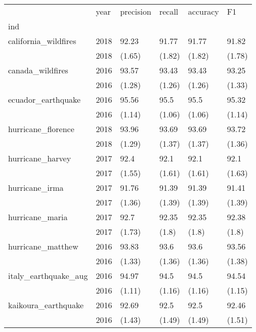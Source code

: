 \begin{tabular}{llllll}
\toprule
{} &  year & precision &  recall & accuracy &      F1 \\
ind                      &       &           &         &          &         \\
\midrule
california\_wildfires     &  2018 &     92.23 &   91.77 &    91.77 &   91.82 \\
                         &  2018 &    (1.65) &  (1.82) &   (1.82) &  (1.78) \\
canada\_wildfires         &  2016 &     93.57 &   93.43 &    93.43 &   93.25 \\
                         &  2016 &    (1.28) &  (1.26) &   (1.26) &  (1.33) \\
ecuador\_earthquake       &  2016 &     95.56 &    95.5 &     95.5 &   95.32 \\
                         &  2016 &    (1.14) &  (1.06) &   (1.06) &  (1.14) \\
hurricane\_florence       &  2018 &     93.96 &   93.69 &    93.69 &   93.72 \\
                         &  2018 &    (1.29) &  (1.37) &   (1.37) &  (1.36) \\
hurricane\_harvey         &  2017 &      92.4 &    92.1 &     92.1 &    92.1 \\
                         &  2017 &    (1.55) &  (1.61) &   (1.61) &  (1.63) \\
hurricane\_irma           &  2017 &     91.76 &   91.39 &    91.39 &   91.41 \\
                         &  2017 &    (1.36) &  (1.39) &   (1.39) &  (1.39) \\
hurricane\_maria          &  2017 &      92.7 &   92.35 &    92.35 &   92.38 \\
                         &  2017 &    (1.73) &   (1.8) &    (1.8) &   (1.8) \\
hurricane\_matthew        &  2016 &     93.83 &    93.6 &     93.6 &   93.56 \\
                         &  2016 &    (1.33) &  (1.36) &   (1.36) &  (1.38) \\
italy\_earthquake\_aug     &  2016 &     94.97 &    94.5 &     94.5 &   94.54 \\
                         &  2016 &    (1.11) &  (1.16) &   (1.16) &  (1.15) \\
kaikoura\_earthquake      &  2016 &     92.69 &    92.5 &     92.5 &   92.46 \\
                         &  2016 &    (1.43) &  (1.49) &   (1.49) &  (1.51) \\

\end{tabular}
